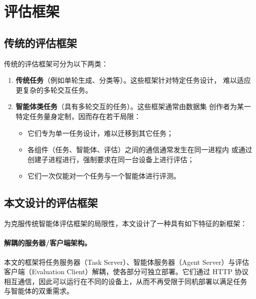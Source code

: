 
\appendix
\renewcommand{\thesection}{\Alph{section}}
\setcounter{section}{0}

\section{评估框架}\label{app:framework}

\subsection{传统的评估框架}

传统的评估框架可分为以下两类：
\begin{enumerate}[label=\arabic*．,leftmargin=*]
    \item \textbf{传统任务}（例如单轮生成、分类等）。这些框架针对特定任务设计，
          难以适应更复杂的多轮交互任务。
    \item \textbf{智能体类任务}（具有多轮交互的任务）。这些框架通常由数据集
          创作者为某一特定任务量身定制，因而存在若干局限：
    \begin{itemize}
        \item 它们专为单一任务设计，难以迁移到其它任务；
        \item 各组件（任务、智能体、评估）之间的通信通常发生在同一进程内
              或通过创建子进程进行，强制要求在同一台设备上进行评估；
        \item 它们一次仅能对一个任务与一个智能体进行评测。
    \end{itemize}
\end{enumerate}

\subsection{本文设计的评估框架}

为克服传统智能体评估框架的局限性，本文设计了一种具有如下特征的新框架：

\paragraph{解耦的服务器/客户端架构。}
本文的框架将任务服务器（Task Server）、智能体服务器（Agent Server）与评估
客户端（Evaluation Client）解耦，使各部分可独立部署。它们通过 HTTP 协议
相互通信，因此可以运行在不同的设备上，从而不再受限于同机部署以满足任务
与智能体的双重需求。

